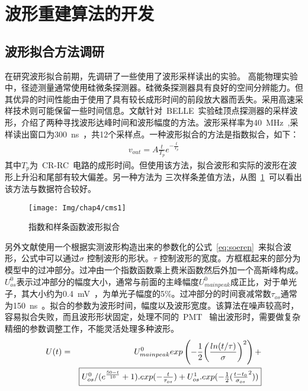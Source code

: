 \section{波形重建算法的开发}
\subsection{波形拟合方法调研}
在研究波形拟合前期，先调研了一些使用了波形采样读出的实验。
高能物理实验中，径迹测量通常使用硅微条探测器。硅微条探测器具有良好的空间分辨能力。但其优异的时间性能由于使用了具有较长成形时间的前段放大器而丢失。采用高速采样技术则可能保留一些时间信息。文献\citep{friedl2007time}针对~BELLE~实验硅顶点探测器的采样波形，介绍了两种寻找波形达峰时间和波形幅度的方法。波形采样率为40~MHz~,采样读出窗口为300~ns~，共12个采样点。一种波形拟合的方法是指数拟合，如下：
\begin{eqnarray}
\label{expfit}
v_{out}=A\frac{t}{T_p}e^{-\frac{t}{T_p}}
\end{eqnarray}
其中$T_{p}$为~CR-RC~电路的成形时间。但使用该方法，拟合波形和实际的波形在波形上升沿和尾部有较大偏差。另一种方法为
三次样条差值方法，从图~\ref{fig:cms_1}~可以看出该方法与数据符合较好。
\begin{figure}[!htbp]
  \centering
   \texttt{[image: Img/chap4/cms1]}
    \caption{ 指数和样条函数波形拟合}
    \label{fig:cms_1}
\end{figure}
%

另外文献\citep{S2012PMT}使用一个根据实测波形构造出来的参数化的公式~\ref{eq:soeren}~来拟合波形，公式中可以通过$\sigma$ 控制波形的形状。$\tau$ 控制波形的宽度。方框框起来的部分为模型中的过冲部分。过冲由一个指数函数乘上费米函数然后外加一个高斯峰构成。$U^0_{os}$表示过冲部分的幅度大小，通常与前面的主峰幅度$U^0_{mainpeak}$成正比，对于单光子，其大小约为0.4~mV~，为单光子幅度的5\%。过冲部分的时间衰减常数$\tau_{os}$通常为150~ns~。拟合的参数为波形时间，幅度以及波形宽度。该算法在噪声较高时，容易拟合失败，而且波形形状固定，处理不同的~PMT~ 输出波形时，需要做复杂精细的参数调整工作，不能灵活处理多种波形。
\begin{eqnarray}\label{eq:soeren}
U(t) &=&U^0_{mainpeak}exp\left( -\frac{1}{2}{\left( \frac{ln(t/\tau)}{\sigma}\right)}^2\right)+ \\ \nonumber
&&\fbox{$U^0_{os}/(e^{\frac{50-t}{10}}+1).exp(-\frac{t}{\tau_{os}})+
U^1_{os}.exp(-\frac{1}{2}(\frac{t-t_0}{\sigma_{os}}^2))$}
\end{eqnarray}
